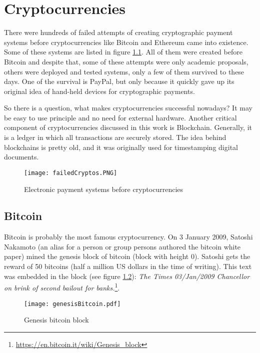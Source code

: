 \chapter{Cryptocurrencies}
\label{Cryptocurrencies}

There were hundreds of failed attempts of creating cryptographic payment systems before cryptocurrencies like Bitcoin and Ethereum came into existence. Some of these systems are listed in figure \ref{paymentSystems}. All of them were created before Bitcoin and despite that, some of these attempts were only academic proposals, others were deployed and tested systems, only a few of them survived to these days. One of the survival is PayPal, but only because it quickly gave up its original idea of hand-held devices for cryptographic payments.\cite{wayner1997digital}

So there is a question, what makes cryptocurrencies successful nowadays?  It may be easy to use principle and no need for external hardware. 
Another critical component of cryptocurrencies discussed in this work is Blockchain. Generally, it is a ledger in which all transactions are securely stored. The idea behind blockchains is pretty old, and it was originally used for timestamping digital documents.\cite{haber1990time} 


\begin{figure}[h]
    \centering
    \texttt{[image: failedCryptos.PNG]}
    \caption{Electronic payment systems before cryptocurrencies \cite{narayanan2016bitcoin}}
    \label{paymentSystems}
\end{figure}


\section{Bitcoin}
Bitcoin is probably the most famous cryptocurrency. On 3 January 2009, Satoshi Nakamoto (an alias for a person or group persons authored the bitcoin white paper) mined the genesis block of bitcoin (block with height 0). Satoshi gets the reward of 50 bitcoins (half a million US dollars in the time of writing). This text was embedded in the block (see figure \ref{genesisBitcoin}): \textit{The Times 03/Jan/2009 Chancellor on brink of second bailout for banks.}\footnote{\url{https://en.bitcoin.it/wiki/Genesis\_block}}\cite{newYorkerBTC}. 

\begin{figure}[h]
    \centering
    \texttt{[image: genesisBitcoin.pdf]}
    \caption{Genesis bitcoin block}
    \label{genesisBitcoin}
\end{figure}

